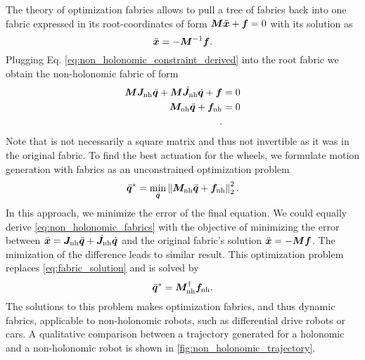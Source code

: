 The theory of optimization fabrics allows to pull a tree of fabrics back into one fabric
expressed in its root-coordinates of form $\bm{M}\ddot{\bm{x}} + \bm{f} = 0$ with its solution as
\begin{equation}
  \ddot{\bm{x}} = -\bm{M}^{-1}\bm{f}.
  \label{eq:fabric_solution}
\end{equation}
Plugging Eq. \ref{eq:non_holonomic_constraint_derived} into the root
fabric we obtain the non\hyp{}holonomic fabric of form
\begin{align*}
  \bm{M}\bm{J}_{\textrm{nh}}\ddot{\bm{q}} + \bm{M}\dot{\bm{J}}_{\textrm{nh}}\dot{\bm{q}} + \bm{f} & = 0 \\
  \bm{M}_{\textrm{nh}}\ddot{\bm{q}} + \bm{f}_{\textrm{nh}} & = 0 \\.
\end{align*}
Note that \Mnh{} is not necessarily a square matrix and thus not invertible as it was in the
original fabric. To find the best actuation for the wheels, we
formulate motion generation with fabrics as an
unconstrained optimization problem
\begin{equation}
  \ddot{\bm{q}}^{\ast} = \min_{\ddot{\bm{q}}}\left\lVert\bm{M}_{\textrm{nh}}\ddot{\bm{q}} + \bm{f}_{\textrm{nh}}\right\rVert_2^2.
  \label{eq:non_holonomic_fabrics}
\end{equation}
In this approach, we minimize the error of the final equation. We
could equally derive \cref{eq:non_holonomic_fabrics} with the objective
of minimizing the error between $\ddot{\bm{x}} = \bm{J}_{\textrm{nh}}\ddot{\bm{q}}+\dot{\bm{J}}_{\textrm{nh}}\dot{\bm{q}}$ and the
original fabric's solution $\ddot{\bm{x}} = -\bm{M}\bm{f}$. The mimization of the difference
leads to similar result.
This optimization problem replaces \cref{eq:fabric_solution} and is solved by
\begin{equation}
  \ddot{\bm{q}}^{\ast} = \bm{M}_{\textrm{nh}}^{\dagger}\bm{f}_{\textrm{nh}}.
\end{equation}
The solutions to this problem makes optimization fabrics, and thus dynamic fabrics,
applicable to non\hyp{}holonomic robots, such as differential drive robots or cars.
A qualitative comparison between a trajectory generated for a holonomic
and a non\hyp{}holonomic robot is shown in \cref{fig:non_holonomic_trajectory}.
